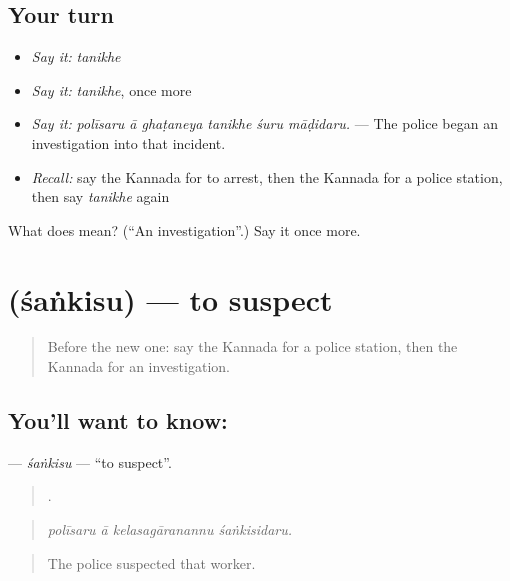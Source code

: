 \subsection*{Your turn}
\begin{itemize}
\raggedright
  \item \emph{Say it:} \emph{tanikhe}
  \item \emph{Say it:} \emph{tanikhe}, once more
  \item \emph{Say it:} \emph{polīsaru ā ghaṭaneya tanikhe śuru māḍidaru.} — The police began an investigation into that incident.
  \item \emph{Recall:} say the Kannada for to arrest, then the Kannada for a police station, then say \emph{tanikhe} again
\end{itemize}

\begin{tcolorbox}[breakable,colback=teal!4,colframe=teal!35!black,title={Before you move on}]
What does  mean? (\textquotedblleft{}An investigation\textquotedblright{}.) Say it once more.
\end{tcolorbox}
\section[\texorpdfstring{\kn{ಶಂಕಿಸು} (śaṅkisu)}{ಶಂಕಿಸು (śaṅkisu)}]{ (śaṅkisu) — to suspect}

\label{lesson:KA-C323-sankisu}



\begin{quote}
Before the new one: say the Kannada for a police station, then the Kannada for an investigation.
\end{quote}

\subsection*{You'll want to know: }
\textbf{} — \emph{śaṅkisu} — \textquotedblleft{}to suspect\textquotedblright{}.

\begin{quote}
   .
\end{quote}

\begin{quote}
\emph{polīsaru ā kelasagāranannu śaṅkisidaru.}
\end{quote}

\begin{quote}
The police suspected that worker.
\end{quote}

